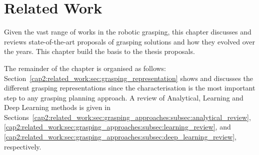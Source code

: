 \chapter{Related Work}
\label{cap2:related_work}

Given the vast range of works in the robotic grasping, this chapter discusses and reviews state-of-the-art proposals of grasping solutions and how they evolved over the years. This chapter build the basis to the thesis proposals.



The remainder of the chapter is organised as follows: Section~\ref{cap2:related_work:sec:grasping_representation} shows and discusses the different grasping representations since the characterisation is the most important step to any grasping planning approach. A review of Analytical, Learning and Deep Learning methods is given in Sections~\ref{cap2:related_work:sec:grasping_approaches:subsec:analytical_review}, \ref{cap2:related_work:sec:grasping_approaches:subsec:learning_review}, and \ref{cap2:related_work:sec:grasping_approaches:subsec:deep_learning_review}, respectively.





